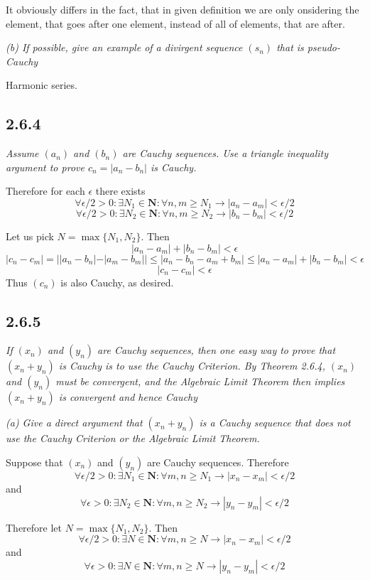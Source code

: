 \documentclass[11pt,oneside,titlepage]{book}
\begin{document}
It obviously differs in the fact, that in given definition we are only
onsidering the element, that goes after one element, instead of
all of elements, that are after.

\textit{(b) If possible, give an example of a divirgent sequence $(s_n)$ that
  is pseudo-Cauchy}

Harmonic series.

\subsection*{2.6.4}
\textit{Assume $(a_n)$ and $(b_n)$ are Cauchy sequences. Use a triangle
  inequality argument to prove $c_n = |a_n - b_n|$ is Cauchy.}

Therefore for each $\epsilon$ there exists
$$\forall \epsilon/2 > 0: \exists N_1 \in \textbf{N}: \forall n,m \geq N_1 \to
|a_n - a_m| < \epsilon/2$$
$$\forall \epsilon/2 > 0: \exists N_2 \in \textbf{N}: \forall n,m \geq N_2 \to
|b_n - b_m| < \epsilon/2$$

Let us pick $N = \max\{N_1, N_2\}$. Then
$$|a_n - a_m| + |b_n - b_m| < \epsilon$$
$$|c_n - c_m| = ||a_n - b_n| - |a_m - b_m|| \leq |a_n - b_n - a_m + b_m|
\leq |a_n - a_m| + |b_n - b_m| < \epsilon$$
$$|c_n - c_m|  < \epsilon$$
Thus $(c_n)$ is also Cauchy, as desired.

\subsection*{2.6.5}
\textit{If $(x_n)$ and $(y_n)$ are Cauchy sequences, then one easy way to
  prove that $(x_n + y_n)$ is Cauchy is to use the Cauchy Criterion. By
  Theorem 2.6.4, $(x_n)$ and $(y_n)$ must be convergent, and the Algebraic
  Limit Theorem then implies $(x_n + y_n)$ is convergent and hence Cauchy}

\textit{(a) Give a direct argument that $(x_n + y_n)$ is a Cauchy
  sequence that does not use the Cauchy Criterion or the Algebraic Limit
  Theorem.}

Suppose that $(x_n)$ and $(y_n)$ are Cauchy sequences. Therefore
$$\forall \epsilon/2 > 0: \exists N_1 \in \textbf{N}: \forall m,n \geq N_1 \to
|x_n - x_m| < \epsilon/2$$
and
$$\forall \epsilon > 0: \exists N_2 \in \textbf{N}: \forall m,n \geq N_2 \to
|y_n - y_m| < \epsilon/2$$

Therefore let $N = \max\{N_1, N_2\}$. Then
$$\forall \epsilon/2 > 0: \exists N \in \textbf{N}: \forall m,n \geq N \to
|x_n - x_m| < \epsilon/2$$
and
$$\forall \epsilon > 0: \exists N \in \textbf{N}: \forall m,n \geq N \to
|y_n - y_m| < \epsilon/2$$
\end{document}
